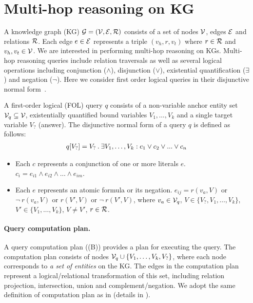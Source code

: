 
\section{Multi-hop reasoning on KG}\label{sec:background}
A knowledge graph (KG) $\mathcal{G}=(\mathcal{V}, \mathcal{E}, \mathcal{R})$ consists of a set of nodes $\mathcal{V}$, edges $\mathcal{E}$ and relations $\mathcal{R}$. Each edge $e\in\mathcal{E}$ represents a triple $(v_h,r,v_t)$ where $r\in\mathcal{R}$ and $v_h,v_t\in\mathcal{V}$. We are interested in performing multi-hop reasoning on KGs. Multi-hop reasoning queries include relation traversals as well as several logical operations including conjunction ($\wedge$), disjunction ($\vee$), existential quantification ($\exists$) and negation ($\neg$). Here we consider first order logical queries in their disjunctive normal form~\citep{ren2020beta}. 
%
\begin{definition}\label{def:query}
A first-order logical (FOL) query $q$ consists of a non-variable anchor entity set $\mathcal{V}_q \subseteq \mathcal{V}$, existentially quantified bound variables $V_1, \dots, V_k$ and a single target variable $V_?$ (answer). The disjunctive normal form of a query $q$ is defined as follows: 
\begin{align*}
\centering
	\textstyle
    q[V_{?}] = V_?\:.\:\exists V_1, \ldots, V_k : c_1 \vee c_2 \vee ... \vee c_n
\end{align*}
%
\begin{itemize}[noitemsep,topsep=0pt,parsep=0pt,partopsep=0pt, leftmargin=*]
    \item Each $c$ represents a conjunction of one or more literals $e$. $c_i = e_{i1} \wedge e_{i2} \wedge \dots \wedge e_{im}$.
    \item Each $e$ represents an atomic formula or its negation. $e_{ij} = r(v_a, V)$ or $\neg\:r(v_a, V)$ or $r(V', V)$ or $\neg\:r(V', V)$, where $v_a \in \mathcal{V}_q$, $V \in \{V_?,V_1,\ldots,V_k\}$, $V' \in \{V_1,\ldots,V_k\}$, $V\neq V'$, $r \in \mathcal{R}$.
\end{itemize}
\end{definition}

\paragraph{Query computation plan.} 
A query computation plan ((B)) provides a plan for executing the query. The computation plan consists of nodes $\mathcal{V}_q \cup \{V_1, \dots, V_k, V_?\}$, where each node corresponds to \emph{a set of entities} on the KG. The edges in the computation plan represent a logical/relational transformation of this set, including relation projection, intersection, union and complement/negation. We adopt the same definition of computation plan as in \cite{ren2020beta} (details in ).

